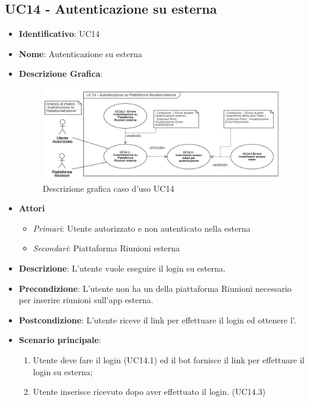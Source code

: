 \subsection{UC14 - Autenticazione su  esterna}
\begin{itemize}
	\item \textbf{Identificativo}: UC14
	\item \textbf{Nome}: Autenticazione su  esterna
	\item\textbf{Descrizione Grafica}: 
	\begin{figure}[h]
		\centering
		\includegraphics[scale=0.60]{images/UC14.png} 
		\caption{Descrizione grafica caso d'uso UC14}
	 \end{figure}

	\item \textbf{Attori}
	\begin{itemize} 
		\item \textit{Primari}: Utente autorizzato e non autenticato nella  esterna
		\item \textit{Secondari}: Piattaforma Riunioni esterna
	\end{itemize}
	\item \textbf{Descrizione}: L'utente vuole eseguire il login su  esterna.
	\item \textbf{Precondizione}: L'utente non ha un  della piattaforma Riunioni necessario per inserire riunioni sull'app esterna.
	\item \textbf{Postcondizione}: L'utente riceve il link per effettuare il login ed ottenere l'.
	\item \textbf{Scenario principale}: \begin{enumerate}
		\item Utente deve fare il login (UC14.1) ed il bot fornisce il link per effettuare il login su  esterna; 
		\item Utente inserisce  ricevuto dopo aver effettuato il login. (UC14.3)
	\end{enumerate}
\end{itemize}
\newpage

